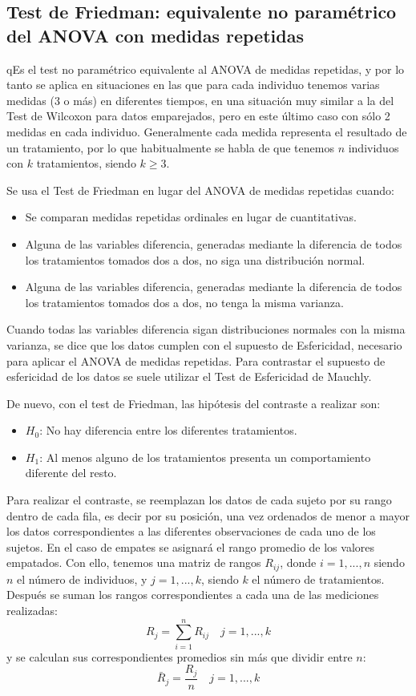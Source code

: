 \subsection{Test de Friedman: equivalente no paramétrico del ANOVA con medidas repetidas}
qEs el test no paramétrico equivalente al ANOVA de medidas repetidas, y por lo tanto se aplica en situaciones en las que para cada individuo
tenemos varias medidas (3 o más) en diferentes tiempos, en una situación muy similar a la del Test de Wilcoxon para datos emparejados, pero en este último caso con sólo 2 medidas en cada individuo. Generalmente cada medida representa el resultado de un tratamiento, por lo que habitualmente se habla de que tenemos $n$ individuos con $k$ tratamientos, siendo $k\geq3$.

Se usa el Test de Friedman en lugar del ANOVA de medidas repetidas cuando:
\begin{itemize}
\item Se comparan medidas repetidas ordinales en lugar de cuantitativas.
\item Alguna de las variables diferencia, generadas mediante la diferencia de todos los tratamientos tomados dos a dos, no siga una
distribución normal.
\item Alguna de las variables diferencia, generadas mediante la diferencia de todos los tratamientos tomados dos a dos, no tenga la misma
varianza.
\end{itemize}

Cuando todas las variables diferencia sigan distribuciones normales con la misma varianza, se dice que los datos cumplen con el supuesto de
Esfericidad, necesario para aplicar el ANOVA de medidas repetidas. Para contrastar el supuesto de esfericidad de los datos se suele utilizar
el Test de Esfericidad de Mauchly.

De nuevo, con el test de Friedman, las hipótesis del contraste a realizar son:
\begin{itemize}
\item $H_0$: No hay diferencia entre los diferentes tratamientos.
\item $H_1$: Al menos alguno de los tratamientos presenta un comportamiento diferente del resto.
\end{itemize}

Para realizar el contraste, se reemplazan los datos de cada sujeto por su rango dentro de cada fila, es decir por su posición, una vez
ordenados de menor a mayor los datos correspondientes a las diferentes observaciones de cada uno de los sujetos. En el caso de empates se
asignará el rango promedio de los valores empatados. Con ello, tenemos una matriz de rangos $R_{ij}$, donde $i=1,...,n$ siendo $n$ el número
de individuos, y $j=1,...,k$, siendo $k$ el número de tratamientos. Después se suman los rangos correspondientes a cada una de las
mediciones realizadas:
\[
R_j  = \sum\limits_{i = 1}^n {R_{ij} } \quad j = 1,...,k
\]
y se calculan sus correspondientes promedios sin más que dividir entre $n$:
\[
\bar R_j  = \frac{{R_j }}{n}\quad j = 1,...,k
\]

